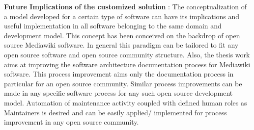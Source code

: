 \textbf{Future Implications of the customized solution} : 
\newline The conceptualization of a model developed for a certain type of software can have its implications and useful implementation in all software belonging to the same domain and development model.
\newline This concept has been conceived on the backdrop of open source Mediawiki software. In general this paradigm can be tailored to fit any open source software and open source community structure. Also, the thesis work aims at improving the software architecture documentation process for Mediawiki software. 
\newline This process improvement aims only the documentation process in particular for an open source community. Similar process improvements can be made in any specific software process for any such open source development model. Automation of maintenance activity coupled with defined human roles as Maintainers is desired and can be easily applied/ implemented for process improvement in any open source community.
